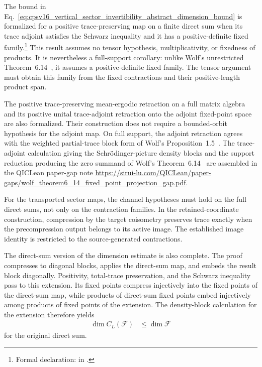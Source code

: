 \documentclass{article}
\begin{document}
The bound in
Eq.~\ref{eq:cpsv16_vertical_sector_invertibility_abstract_dimension_bound} is
formalized for a positive trace-preserving map on a finite direct sum when its
trace adjoint satisfies the Schwarz inequality and it has a positive-definite
fixed family.\footnote{Formal declaration:
in .}
This result assumes no tensor hypothesis, multiplicativity, or fixedness of
products. It is nevertheless a full-support corollary: unlike Wolf's
unrestricted Theorem~6.14~\cite{Wolf2012Quantum}, it assumes a
positive-definite fixed family. The tensor argument must obtain this family
from the fixed contractions and their positive-length product span.

The positive trace-preserving mean-ergodic retraction on a full matrix algebra
and its positive unital trace-adjoint retraction onto the adjoint fixed-point
space are also formalized. Their construction does not require a bounded-orbit
hypothesis for the adjoint map. On full support, the adjoint retraction agrees
with the weighted partial-trace block form of Wolf's
Proposition~1.5~\cite{Wolf2012Quantum}. The trace-adjoint calculation giving
the Schr\"odinger-picture density blocks and the support reduction producing
the zero summand of Wolf's Theorem~6.14~\cite{Wolf2012Quantum} are assembled
in the QICLean paper-gap note
\url{https://sirui-lu.com/QICLean/paper-gaps/wolf_theorem6_14_fixed_point_projection_gap.pdf}.

For the transported sector maps, the channel hypotheses must hold on the full
direct sums, not only on the contraction families. In the retained-coordinate
construction, compression by the target coisometry preserves trace exactly
when the precompression output belongs to its active image. The established
image identity is restricted to the source-generated contractions.

The direct-sum version of the dimension estimate is also complete. The proof
compresses to diagonal blocks, applies the direct-sum map, and embeds the
result block diagonally. Positivity, total-trace preservation, and the Schwarz
inequality pass to this extension. Its fixed points compress injectively into
the fixed points of the direct-sum map, while products of direct-sum fixed
points embed injectively among products of fixed points of the extension. The
density-block calculation for the extension therefore yields
\begin{align}
    \dim C_L(\mathcal F)
        &\leq \dim\mathcal F
    \label{eq:cpsv16_vertical_sector_invertibility_direct_sum_dimension_bound}
\end{align}
for the original direct sum.
\end{document}
